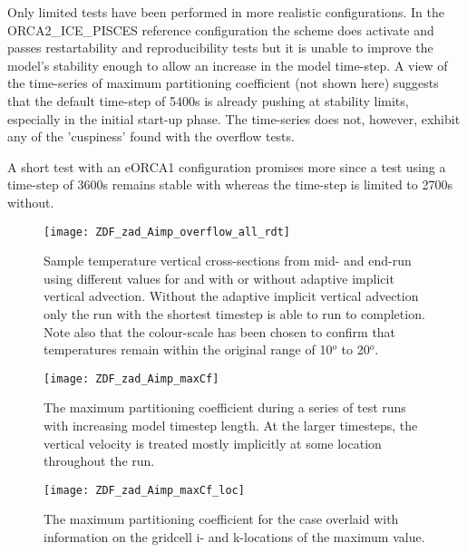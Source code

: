 \documentclass[../main/NEMO_manual]{subfiles}
\begin{document}
\medskip
\noindent Only limited tests have been performed in more realistic configurations. In the
ORCA2\_ICE\_PISCES reference configuration the scheme does activate and passes
restartability and reproducibility tests but it is unable to improve the model's stability
enough to allow an increase in the model time-step. A view of the time-series of maximum
partitioning coefficient (not shown here)  suggests that the default time-step of 5400s is
already pushing at stability limits, especially in the initial start-up phase. The
time-series does not, however, exhibit any of the 'cuspiness' found with the overflow
tests.

\medskip
\noindent A short test with an eORCA1 configuration promises more since a test using a
time-step of 3600s remains stable with  whereas the
time-step is limited to 2700s without.

\begin{figure}[!t]
  \centering
  \texttt{[image: ZDF\_zad\_Aimp\_overflow\_all\_rdt]}
  \caption[OVERFLOW: sample temperature vertical cross-sections from mid- and end-run]{
    Sample temperature vertical cross-sections from mid- and end-run using
    different values for  and with or without adaptive implicit vertical advection.
    Without the adaptive implicit vertical advection
    only the run with the shortest timestep is able to run to completion.
    Note also that the colour-scale has been chosen to confirm that
    temperatures remain within the original range of 10$^o$ to 20$^o$.}
  \label{fig:ZDF_zad_Aimp_overflow_all_rdt}
\end{figure}

\begin{figure}[!t]
  \centering
  \texttt{[image: ZDF\_zad\_Aimp\_maxCf]}
  \caption[OVERFLOW: maximum partitioning coefficient during a series of test runs]{
    The maximum partitioning coefficient during a series of test runs with
    increasing model timestep length.
    At the larger timesteps,
    the vertical velocity is treated mostly implicitly at some location throughout the run.}
  \label{fig:ZDF_zad_Aimp_maxCf}
\end{figure}

\begin{figure}[!t]
  \centering
  \texttt{[image: ZDF\_zad\_Aimp\_maxCf\_loc]}
  \caption[OVERFLOW: maximum partitioning coefficient for the case overlaid]{
    The maximum partitioning coefficient for the  case overlaid with
    information on the gridcell i- and k-locations of the maximum value.}
  \label{fig:ZDF_zad_Aimp_maxCf_loc}
\end{figure}

\subinc{}
\end{document}
